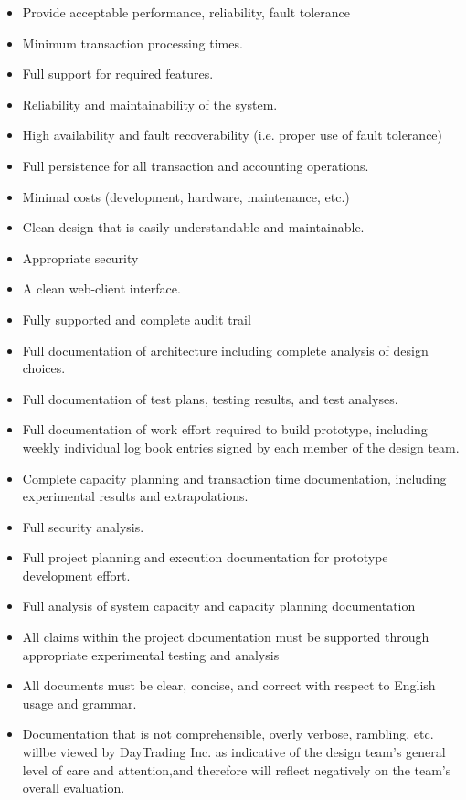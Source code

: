 \documentclass[a4paper,10pt]{article}
\begin{document}
\begin{itemize}
\item Provide acceptable performance, reliability, fault tolerance
\item Minimum transaction processing times.
\item Full support for required features.
\item Reliability and maintainability of the system.
\item High availability and fault recoverability (i.e. proper use of fault 
tolerance)
\item Full persistence for all transaction and accounting operations.
\item Minimal costs (development, hardware, maintenance, etc.)
\item Clean design that is easily understandable and maintainable.
\item Appropriate security
\item A clean web-client interface.
\item Fully supported and complete audit trail
\item Full documentation of architecture including complete analysis of design 
choices.
\item Full documentation of test plans, testing results, and test analyses.
\item Full documentation of work effort required to build prototype, including 
weekly individual log book entries signed by each member of the design team.
\item Complete capacity planning and transaction time documentation, including 
experimental results and extrapolations. 
\item Full security analysis.
\item Full project planning and execution documentation for prototype 
development effort.
\item Full analysis of system capacity and capacity planning documentation

\item All claims within the project documentation must be supported through 
appropriate experimental testing and analysis
\item All documents must be clear, concise, and correct with respect to English
usage and grammar.
\item Documentation that is not comprehensible, overly verbose, rambling, etc. 
willbe viewed by DayTrading Inc. as indicative of the design team’s general 
level of care and attention,and therefore will reflect negatively on the 
team’s overall evaluation. 


\end{itemize}
\end{document}
